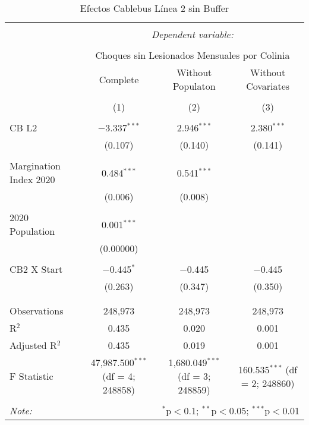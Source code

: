 
\begin{table}[!htbp] \centering 
  \caption{Efectos Cablebus Línea 2 sin Buffer} 
  \label{} 
\begin{tabular}{@{\extracolsep{5pt}}lccc} 
\\[-1.8ex]\hline 
\hline \\[-1.8ex] 
 & \multicolumn{3}{c}{\textit{Dependent variable:}} \\ 
\cline{2-4} 
\\[-1.8ex] & \multicolumn{3}{c}{Choques sin Lesionados Mensuales por Colinia} \\ 
 & Complete & Without Populaton & Without Covariates \\ 
\\[-1.8ex] & (1) & (2) & (3)\\ 
\hline \\[-1.8ex] 
 CB L2 & $-$3.337$^{***}$ & 2.946$^{***}$ & 2.380$^{***}$ \\ 
  & (0.107) & (0.140) & (0.141) \\ 
  & & & \\ 
 Margination Index 2020 & 0.484$^{***}$ & 0.541$^{***}$ &  \\ 
  & (0.006) & (0.008) &  \\ 
  & & & \\ 
 2020 Population & 0.001$^{***}$ &  &  \\ 
  & (0.00000) &  &  \\ 
  & & & \\ 
 CB2 X Start & $-$0.445$^{*}$ & $-$0.445 & $-$0.445 \\ 
  & (0.263) & (0.347) & (0.350) \\ 
  & & & \\ 
\hline \\[-1.8ex] 
Observations & 248,973 & 248,973 & 248,973 \\ 
R$^{2}$ & 0.435 & 0.020 & 0.001 \\ 
Adjusted R$^{2}$ & 0.435 & 0.019 & 0.001 \\ 
F Statistic & 47,987.500$^{***}$ (df = 4; 248858) & 1,680.049$^{***}$ (df = 3; 248859) & 160.535$^{***}$ (df = 2; 248860) \\ 
\hline 
\hline \\[-1.8ex] 
\textit{Note:}  & \multicolumn{3}{r}{$^{*}$p$<$0.1; $^{**}$p$<$0.05; $^{***}$p$<$0.01} \\ 
\end{tabular} 
\end{table} 
